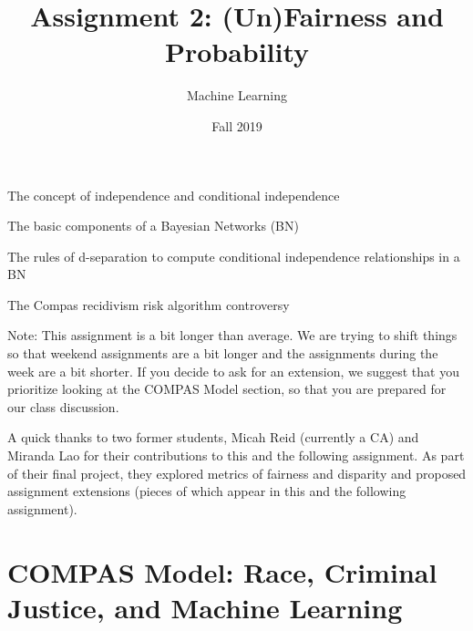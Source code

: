 \documentclass[assignment02_Solutions]{subfiles}
\title{Assignment 2: (Un)Fairness and Probability}
\author{Machine Learning}
\date{Fall 2019}
\begin{document}
\maketitle
\thispagestyle{firstpage}


\begin{learningobjectives}
\bi
\item The concept of independence and conditional independence
\item The basic components of a Bayesian Networks (BN)
\item The rules of d-separation to compute conditional independence relationships in a BN
\item The Compas recidivism risk algorithm controversy
\ei
\end{learningobjectives}

Note: This assignment is a bit longer than average. We are trying to shift things so that weekend assignments are a bit longer and the assignments during the week are a bit shorter. If you decide to ask for an extension, we suggest that you prioritize looking at the COMPAS Model section, so that you are prepared for our class discussion.

A quick thanks to two former students, Micah Reid (currently a CA) and Miranda Lao for their contributions to this and the following assignment. As part of their final project, they explored metrics of fairness and disparity and proposed assignment extensions (pieces of which appear in this and the following assignment). 

\section{COMPAS Model: Race, Criminal Justice, and Machine Learning}
\end{document}

